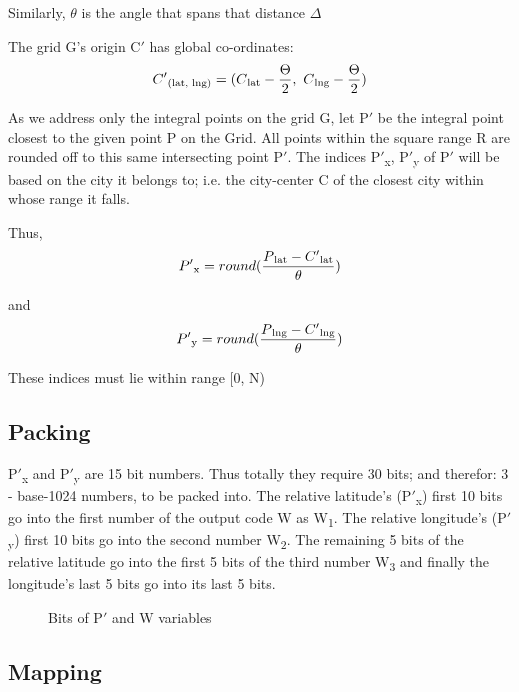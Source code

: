 \documentclass[conference]{IEEEtran}
\begin{document}
Similarly, $\theta$ is the angle that spans that distance $\Delta$

The grid G's origin C$'$ has global co-ordinates:
\begin{equation}C'\textsubscript{(lat, lng)} = ( C\textsubscript{lat} - \frac{\Theta}{2},\ C\textsubscript{lng} - \frac{\Theta}{2})\end{equation}

As we address only the integral points on the grid G, let P$'$ be the integral point closest to the given point P on the Grid.
All points within the square range R are rounded off to this same intersecting point P$'$.
The indices P$'$\textsubscript{x}, P$'$\textsubscript{y} of P$'$ will be based on the city it belongs to;
i.e. the city-center C of the closest city within whose range it falls.


Thus, \begin{equation}P'\textsubscript{x} = round(\frac{P\textsubscript{lat} - C'\textsubscript{lat}} {\theta})\end{equation}

and \begin{equation}P'\textsubscript{y}= round(\frac{P\textsubscript{lng} - C'\textsubscript{lng}} {\theta})\end{equation}

These indices must lie within range [0, N)

\subsection{Packing}
P$'$\textsubscript{x} and P$'$\textsubscript{y} are 15 bit numbers.
Thus totally they require 30 bits; and therefor: 3 - base-1024 numbers, to be packed into.
The relative latitude's (P$'$\textsubscript{x}) first 10 bits go into the first number of the output code W as W\textsubscript{1}. The relative longitude's (P$'$\textsubscript{y}) first 10 bits go into the second number W\textsubscript{2}. The remaining 5 bits of the relative latitude go into the first 5 bits of the third number W\textsubscript{3} and finally the longitude's last 5 bits go into its last 5 bits.
\begin{figure}[H]
\centerline{}
\caption{Bits of P$'$ and W variables}
\label{Packing}
\end{figure}

\subsection{Mapping}
\end{document}
